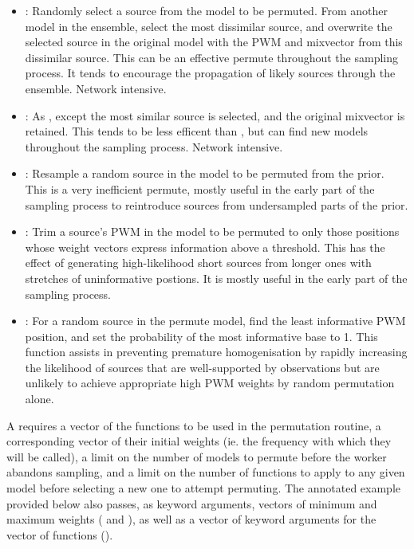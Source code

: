 \documentclass{ut-thesis}
\begin{document}
\begin{NoHyper}
\begin{itemize}
    \item {}: Randomly select a source from the model to be permuted. From another model in the ensemble, select the most dissimilar source, and overwrite the selected source in the original model with the PWM and mixvector from this dissimilar source. This can be an effective permute throughout the sampling process. It tends to encourage the propagation of likely sources through the ensemble. Network intensive.
    \item {}: As , except the most similar source is selected, and the original mixvector is retained. This tends to be less efficent than , but can find new models throughout the sampling process. Network intensive.
    \item {}: Resample a random source in the model to be permuted from the prior. This is a very inefficient permute, mostly useful in the early part of the sampling process to reintroduce sources from undersampled parts of the prior.
    \item {}: Trim a source's PWM in the model to be permuted to only those positions whose weight vectors express information above a threshold. This has the effect of generating high-likelihood short sources from longer ones with stretches of uninformative postions. It is mostly useful in the early part of the sampling process.
    \item {}: For a random source in the permute model, find the least informative PWM position, and set the probability of the most informative base to 1. This function assists in preventing premature homogenisation by rapidly increasing the likelihood of sources that are well-supported by observations but are unlikely to achieve appropriate high PWM weights by random permutation alone.
\end{itemize}

A  requires a vector of the functions to be used in the permutation routine, a corresponding vector of their initial weights (ie. the frequency with which they will be called), a limit on the number of models to permute before the worker abandons sampling, and a limit on the number of functions to apply to any given model before selecting a new one to attempt permuting. The annotated example provided below also passes, as keyword arguments, vectors of minimum and maximum weights ( and ), as well as a vector of keyword arguments for the vector of functions ().


\end{NoHyper}
\end{document}
